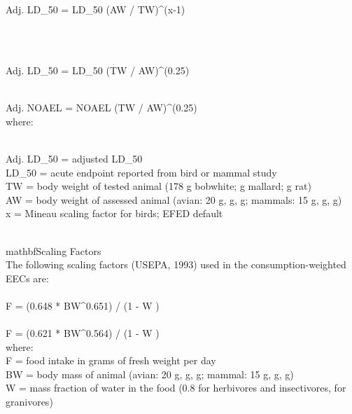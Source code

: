 \\

 \\Adj. LD_{50} = LD_{50} (AW / TW)^{(x-1)} 

\\

\\Adj. LD_{50} = LD_{50} (TW / AW)^{(0.25)} 
\\

\\Adj. NOAEL = NOAEL (TW / AW)^{(0.25)}
 \\where: 

\\Adj. LD_{50} = adjusted LD_{50}
 \\LD_{50} = acute\; endpoint \; reported\; from \; bird \; or\; mammal\; study \\TW = body \; weight \; of\; tested\; animal (178 g\; bobwhite; g \; mallard; g\; rat)
 \\AW = body\; weight \; of\; assessed\; animal (avian: 20 g,  g,  g; \; mammals: 15 g, g,  g)
 \\x = Mineau\; scaling\; factor\; for\; birds; EFED \; default



\\mathbf{Scaling Factors} 
\\The \; following\; scaling \; factors (USEPA, 1993) \;  used \; in\; the \; consumption-weighted \; EECs \; are: 
\\
\\F = (0.648 * BW^{0.651}) / (1 - W ) 
\\ 
\\F = (0.621 * BW^{0.564}) / (1 - W ) 
\\where: 
\\F = food \;intake\; in\; grams\; of \;fresh \;weight \;per\; day
 \\BW = body\; mass \;of \;animal (avian: 20 g, g,  g;\; mammal: 15 g,  g, g)
 \\W = mass\; fraction\; of\; water\; in\; the \;food (0.8\; for\; herbivores \;and \;insectivores, \;for\; granivores)




\\


